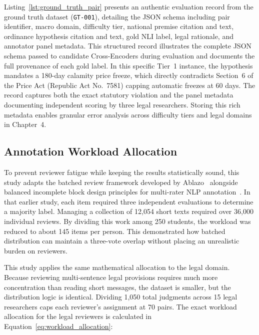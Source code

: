     Listing~\ref{lst:ground_truth_pair} presents an authentic evaluation record from the ground truth dataset (\texttt{GT-001}), detailing the JSON schema including pair identifier, macro domain, difficulty tier, national premise citation and text, ordinance hypothesis citation and text, gold NLI label, legal rationale, and annotator panel metadata. This structured record illustrates the complete JSON schema passed to candidate Cross-Encoders during evaluation and documents the full provenance of each gold label. In this specific Tier~1 instance, the hypothesis mandates a 180-day calamity price freeze, which directly contradicts Section~6 of the Price Act (Republic Act No.~7581) capping automatic freezes at 60 days. The record captures both the exact statutory violation and the panel metadata documenting independent scoring by three legal researchers. Storing this rich metadata enables granular error analysis across difficulty tiers and legal domains in Chapter~4.

    \subsection{Annotation Workload Allocation}
    \label{sec:batched_annotation}
    To prevent reviewer fatigue while keeping the results statistically sound, this study adapts the batched review framework developed by Ablazo~\cite{ablazo2019designing} alongside balanced incomplete block design principles for multi-rater NLP annotation~\cite{bowman2015snli, mchugh2012interrater}. In that earlier study, each item required three independent evaluations to determine a majority label. Managing a collection of 12,054 short texts required over 36,000 individual reviews. By dividing this work among 250 students, the workload was reduced to about 145 items per person. This demonstrated how batched distribution can maintain a three-vote overlap without placing an unrealistic burden on reviewers.

    This study applies the same mathematical allocation to the legal domain. Because reviewing multi-sentence legal provisions requires much more concentration than reading short messages, the dataset is smaller, but the distribution logic is identical. Dividing 1,050 total judgments across 15 legal researchers caps each reviewer's assignment at 70 pairs. The exact workload allocation for the legal reviewers is calculated in Equation~\ref{eq:workload_allocation}:

